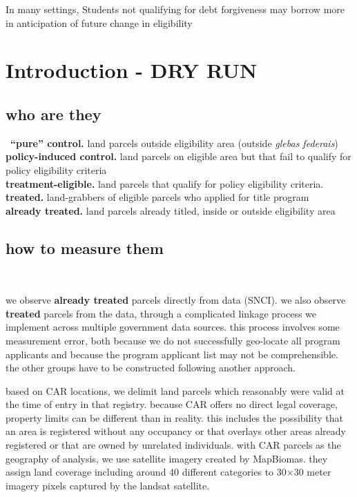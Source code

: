 \documentclass[12pt]{article}
\begin{document}
\quad In many settings, Students not qualifying for debt forgiveness may borrow more in anticipation of future change in eligibility

\section{Introduction - DRY RUN}

\iffalse
\subsection{who are they}
\
\textbf{``pure'' control.} land parcels outside eligibility area (outside \textit{glebas federais})
\ 
\\ 
\textbf{policy-induced control.} land parcels on eligible area but that fail to qualify for policy eligibility criteria
\ 
\\ 
\textbf{treatment-eligible.} land parcels that qualify for policy eligibility criteria.
\ 
\\ 
\textbf{treated.} land-grabbers of eligible parcels who applied for title program
\ 
\\ 
\textbf{already treated.} land parcels already titled, inside or outside eligibility area

\subsection{how to measure them}
\

\quad we observe \textbf{already treated} parcels directly from data (SNCI). we also observe \textbf{treated} parcels from the data, through a complicated linkage process we implement across multiple government data sources. this process involves some measurement error, both because we do not successfully geo-locate all program applicants and because the program applicant list may not be comprehensible. the other groups have to be constructed following another approach.
\ 

\quad based on CAR locations, we delimit land parcels which reasonably were valid at the time of entry in that registry. because CAR offers no direct legal coverage, property limits can be different than in reality. this includes the possibility that an area is registered without any occupancy or that overlays other areas already registered or that are owned by unrelated individuals. with CAR parcels as the geography of analysis, we use satellite imagery created by MapBiomas. they assign land coverage including around 40 different categories to 30$\times$30 meter imagery pixels captured by the landsat satellite. 
\ 
\end{document}
